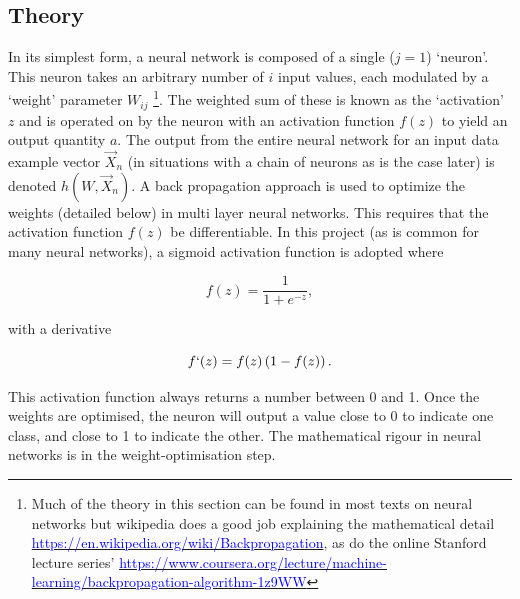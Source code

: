 \documentclass[10pt]{article}
\begin{document}
\subsection{Theory} 


In its simplest form, a neural network is composed of a single ($j=1$) `neuron'. This neuron takes an arbitrary number of $i$ input values, each modulated by a `weight' parameter $W_{ij}$ \footnote{Much of the theory in this section can be found in most texts on neural networks but wikipedia does a good job explaining the mathematical detail \href{ https://en.wikipedia.org/wiki/Backpropagation}{\textcolor{blue}{https://en.wikipedia.org/wiki/Backpropagation}}, as do the online Stanford lecture series' \href{ https://www.coursera.org/lecture/machine-learning/backpropagation-algorithm-1z9WW}{\textcolor{blue}{https://www.coursera.org/lecture/machine-learning/backpropagation-algorithm-1z9WW}}}. The weighted sum of these is known as the `activation' $z$ and is operated on by the neuron with an activation function $f (z)$ to yield an output quantity $a$. The output from the entire neural network for an input data example vector $\vec{X}_n$ (in situations with a chain of neurons as is the case later) is denoted $h(W,\vec{X}_n)$. A back propagation approach is used to optimize the weights (detailed below) in multi layer neural networks. This requires that the activation function $f(z)$ be differentiable. In this project (as is common for many neural networks), a sigmoid activation function is adopted where 

\begin{equation} 
f(z) = \frac{1}{1+e^{-z}},
\label{eq_sigmoid}
\end{equation}

\noindent with a derivative

\begin{equation} 
f`(z) = f(z) \left( 1 - f(z) \right).
\label{eq_sigmoid}
\end{equation}


\noindent This activation function always returns a number between 0 and 1. Once the weights are optimised, the neuron will output a value close to 0 to indicate one class, and close to 1 to indicate the other. The mathematical rigour in neural networks is in the weight-optimisation step. 
\end{document}
